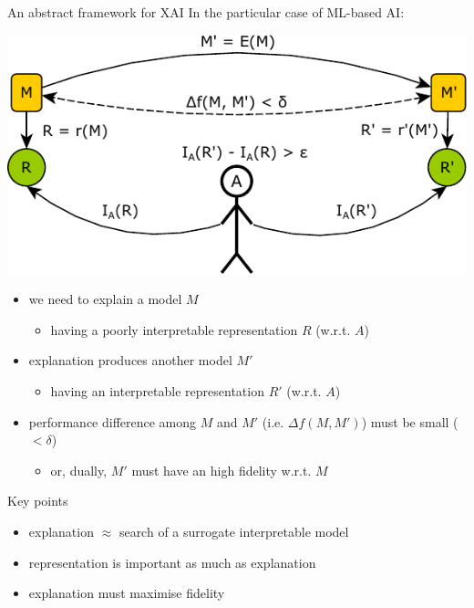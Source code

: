 \documentclass[presentation]{beamer}\mode<presentation>{\usetheme{AMSBolognaFC}}
\begin{document}
\begin{frame}[allowframebreaks]{An abstract framework for XAI}
    In the particular case of ML-based AI:
    \begin{center}
        \includegraphics[width=\linewidth]{figures/global.pdf}
    \end{center}
    \framebreak
    \begin{itemize}
        \item we need to explain a model $M$
        \begin{itemize}
            \item having a poorly interpretable \alert{representation} $R$ (w.r.t. $A$)
        \end{itemize}

        \item explanation produces another model $M'$
        \begin{itemize}
            \item having an interpretable \alert{representation} $R'$ (w.r.t. $A$)
        \end{itemize}

        \item performance difference among $M$ and $M'$ (i.e. $\Delta f(M, M')$) must be small ($< \delta$)
        \begin{itemize}
            \item or, dually, $M'$ must have an high \alert{fidelity} w.r.t. $M$
        \end{itemize}
    \end{itemize}

    \begin{block}{Key points}
        \begin{itemize}
            \item explanation $\approx$ search of a \alert{surrogate} interpretable model
            \item \alert{representation} is important as much as explanation
            \item explanation must maximise \alert{fidelity}
        \end{itemize}
    \end{block}

\end{frame}
\end{document}
